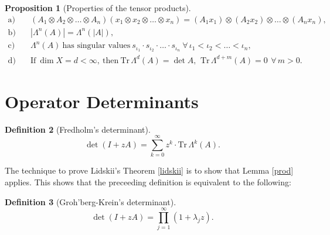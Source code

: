 \documentclass[a4paper, 10pt]{article}
\newcommand{\Tr}{\textrm{Tr}\,}
\theoremstyle{definition}
\newtheorem{definition}{Definition}[section]
\newtheorem{proposition}[definition]{Proposition}
\theoremstyle{remark}
\theoremstyle{remark}
\begin{document}
\begin{proposition}[Properties of the tensor products] 
    \begin{align}
        \text{a)} &\quad (A_1 \otimes A_2 \otimes \ldots \otimes A_n) (x_1 \otimes x_2 \otimes \ldots \otimes x_n) = (A_1 x_1) \otimes (A_2 x_2) \otimes \ldots \otimes (A_n x_n), \\
        \text{b)} &\quad | \Lambda^n (A) | = \Lambda^n (|A|), \\
        \text{c)} &\quad \Lambda^n (A)\ \text{has singular values}\ s_{\iota_1} \cdot s_{\iota_2} \cdot \ldots \cdot s_{\iota_n}\ \forall\, \iota_1 < \iota_2 < \ldots < \iota_n, \\
        \text{d)} &\quad \text{If}\ \dim X = d < \infty,\ \text{then}\ \Tr \Lambda^d (A) = \det A,\,\ \Tr \Lambda^{d+m} (A) = 0\,\ \forall\, m > 0. 
    \end{align}

\end{proposition}

\section{Operator Determinants}

\begin{definition}[Fredholm's determinant]
    \begin{equation}
        \det (I + z A) = \sum_{k=0}^{\infty} z^k \cdot \Tr \Lambda^k (A) . 
    \end{equation}
\end{definition}

The technique to prove Lidskii's Theorem \ref{lidskii} is to show that Lemma \ref{prod} applies. This shows that the preceeding definition is equivalent to the following: 

\begin{definition}[Groh'berg-Krein's determinant]
    \begin{equation}
        \det (I + z A) = \prod_{j=1}^{\infty} (1 + \lambda_j z) . 
    \end{equation}
\end{definition}


\end{document}
